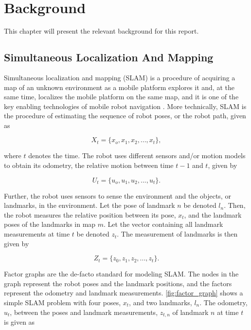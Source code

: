 \chapter{Background}

This chapter will present the relevant background for this report. 

\section{Simultaneous Localization And Mapping}

Simultaneous localization and mapping (SLAM) is a procedure of acquiring a map of an unknown environment as a mobile platform explores it and, at the same time, localizes the mobile platform on the same map, and it is one of the key enabling technologies of mobile robot navigation \cite{Stachniss2016SimultaneousMapping}. More technically, SLAM is the procedure of estimating the sequence of robot poses, or the robot path, given as  

\begin{equation}
    X_t = \{x_o, x_1, x_2,...,x_t\},
    \label{eq:path}
\end{equation}

where $t$ denotes the time. The robot uses different sensors and/or motion models to obtain its odometry, the relative motion between time $t-1$ and $t$, given by

\begin{equation}
    U_t = \{u_o, u_1, u_2,...,u_t\}.
    \label{eq:odom}
\end{equation}

Further, the robot uses sensors to sense the environment and the objects, or landmarks, in the environment. Let the pose of landmark $n$ be denoted $l_n$. Then, the robot measures the relative position between its pose, $x_t$, and the landmark poses of the landmarks in map $m$. Let the vector containing all landmark measurements at time $t$ be denoted $z_t$. The measurement of landmarks is then given by

\begin{equation}
    Z_t = \{z_0, z_1, z_2,...,z_t\}.
    \label{eq:landmark_measurements}
\end{equation}

Factor graphs are the de-facto standard for modeling SLAM. The nodes in the graph represent the robot poses and the landmark positions, and the factors represent the odometry and landmark measurements. \cref{fig:factor_graph} shows a simple SLAM problem with four poses, $x_t$, and two landmarks, $l_n$. The odometry, $u_t$, between the poses and landmark measurements, $z_{t,n}$ of landmark $n$ at time $t$ is given as

